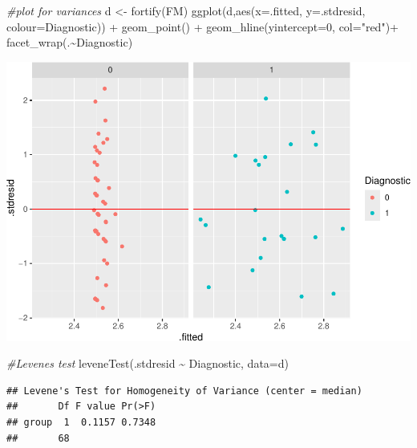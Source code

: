 \documentclass[
]{article}
\newenvironment{Shaded}{\begin{snugshade}}{\end{snugshade}}
\newcommand{\AttributeTok}[1]{\textcolor[rgb]{0.77,0.63,0.00}{#1}}
\newcommand{\CommentTok}[1]{\textcolor[rgb]{0.56,0.35,0.01}{\textit{#1}}}
\newcommand{\DecValTok}[1]{\textcolor[rgb]{0.00,0.00,0.81}{#1}}
\newcommand{\FunctionTok}[1]{\textcolor[rgb]{0.00,0.00,0.00}{#1}}
\newcommand{\NormalTok}[1]{#1}
\newcommand{\OtherTok}[1]{\textcolor[rgb]{0.56,0.35,0.01}{#1}}
\newcommand{\SpecialCharTok}[1]{\textcolor[rgb]{0.00,0.00,0.00}{#1}}
\newcommand{\StringTok}[1]{\textcolor[rgb]{0.31,0.60,0.02}{#1}}
\begin{document}
\begin{Shaded}
\begin{Highlighting}[]
\CommentTok{\#plot for variances}
\NormalTok{d }\OtherTok{\textless{}{-}} \FunctionTok{fortify}\NormalTok{(FM)}
\FunctionTok{ggplot}\NormalTok{(d,}\FunctionTok{aes}\NormalTok{(}\AttributeTok{x=}\NormalTok{.fitted, }\AttributeTok{y=}\NormalTok{.stdresid, }\AttributeTok{colour=}\NormalTok{Diagnostic)) }\SpecialCharTok{+} 
  \FunctionTok{geom\_point}\NormalTok{() }\SpecialCharTok{+} 
  \FunctionTok{geom\_hline}\NormalTok{(}\AttributeTok{yintercept=}\DecValTok{0}\NormalTok{, }\AttributeTok{col=}\StringTok{"red"}\NormalTok{)}\SpecialCharTok{+}
  \FunctionTok{facet\_wrap}\NormalTok{(.}\SpecialCharTok{\textasciitilde{}}\NormalTok{Diagnostic)}
\end{Highlighting}
\end{Shaded}

\includegraphics{WorkingExample2_code_files/figure-latex/unnamed-chunk-14-1.pdf}

\begin{Shaded}
\begin{Highlighting}[]
\CommentTok{\#Levene\textquotesingle{}s test}
\FunctionTok{leveneTest}\NormalTok{(.stdresid }\SpecialCharTok{\textasciitilde{}}\NormalTok{ Diagnostic, }\AttributeTok{data=}\NormalTok{d)}
\end{Highlighting}
\end{Shaded}

\begin{verbatim}
## Levene's Test for Homogeneity of Variance (center = median)
##       Df F value Pr(>F)
## group  1  0.1157 0.7348
##       68
\end{verbatim}
\end{document}
